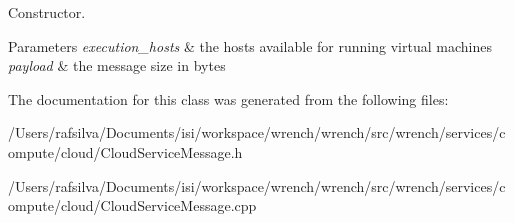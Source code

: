 Constructor. 


\begin{DoxyParams}{Parameters}
{\em execution\+\_\+hosts} & the hosts available for running virtual machines \\
\hline
{\em payload} & the message size in bytes \\
\hline
\end{DoxyParams}


The documentation for this class was generated from the following files\+:\begin{DoxyCompactItemize}
\item 
/\+Users/rafsilva/\+Documents/isi/workspace/wrench/wrench/src/wrench/services/compute/cloud/Cloud\+Service\+Message.\+h\item 
/\+Users/rafsilva/\+Documents/isi/workspace/wrench/wrench/src/wrench/services/compute/cloud/Cloud\+Service\+Message.\+cpp\end{DoxyCompactItemize}
